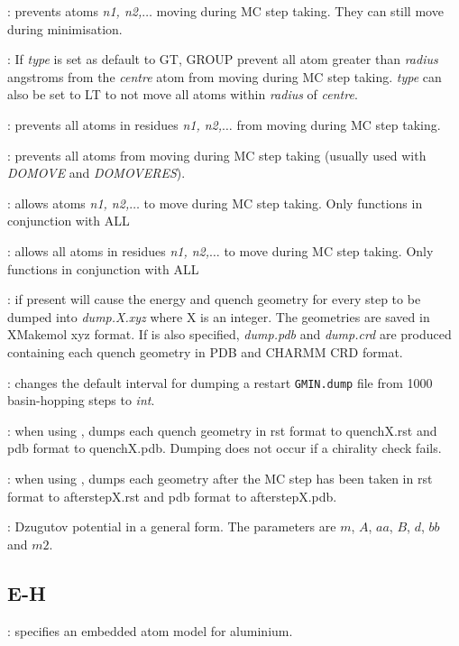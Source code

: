 : prevents atoms {\it n1, n2,$\ldots$} moving during MC step taking. They can still move during minimisation.

: If {\it type} is set as default to {\textrm GT}, {GROUP\/} prevent all atom greater than {\it radius} angstroms from the {\it centre} atom from moving during MC step taking. {\it type} can also be set to LT to not move all atoms within {\it radius} of {\it centre}.

: prevents all atoms in residues {\it n1, n2,$\ldots$} from moving during MC step taking.

: prevents all atoms from moving during MC step taking (usually used with {\it DOMOVE} and {\it DOMOVERES}). 

: allows atoms {\it n1, n2,$\ldots$} to move during MC step taking. Only functions in conjunction with 
{ALL\/}

: allows all atoms in residues {\it n1, n2,$\ldots$} to move during MC step taking. Only functions in conjunction 
with {ALL\/}

: if present will cause the energy and quench geometry for every step
to be dumped into {\it dump.X.xyz\/} where X is an integer. The geometries are saved 
in XMakemol xyz format. If {\/} is also specified, {\it dump.pdb\/} and {\it dump.crd\/}
are produced containing each quench geometry in PDB and CHARMM CRD format.

: changes the default interval for dumping a restart 
{\tt GMIN.dump} file from 1000 basin-hopping steps to {\it int\/}.

: when using {\/}, dumps each quench geometry in rst format to quenchX.rst 
and pdb format to quenchX.pdb. Dumping does not occur if a chirality check fails.

: when using {\/}, dumps each geometry after the MC step has been taken in rst format to afterstepX.rst 
and pdb format to afterstepX.pdb. 

: Dzugutov potential in a general form.
The parameters are $m$, $A$, $aa$, $B$, $d$, $bb$ and $m2$.

\subsection{E-H}
: specifies an embedded atom model for aluminium.

